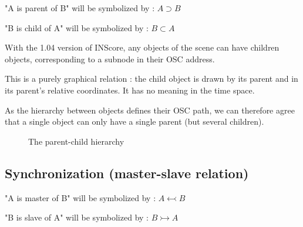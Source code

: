 \documentclass[a4paper]{article}
\begin{document}
"A is parent of B" will be symbolized by : $A \supset B$

"B is child of A" will be symbolized by : $B \subset A$

\bigskip

With the 1.04 version of INScore, any objects of the scene can have children objects, corresponding to a subnode in their OSC address. 

This is a purely graphical relation : the child object is drawn by its parent and in its parent's relative coordinates. It has no meaning in the time space. 

As the hierarchy between objects defines their OSC path, we can therefore agree that a single object can only have a single parent (but several children). 

\bigskip

\begin{figure}[h]
\begin{center}

 \caption{The parent-child hierarchy}
 \label{fig:hierarchy}

\end{center}
\end{figure}

\subsection{Synchronization (master-slave relation)}\label{subsec:sync}

"A is master of B" will be symbolized by : $A \leftarrowtail B$

"B is slave of A" will be symbolized by : $B \rightarrowtail A$
\bigskip
\end{document}
